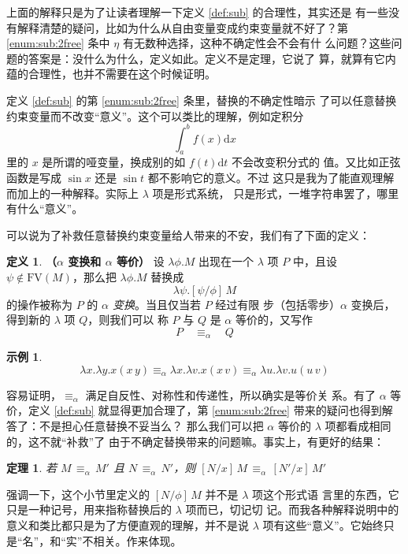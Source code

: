 \documentclass[a4paper,adobefonts]{ctexart}
\newtheorem{theorem}{定理}
\theoremstyle{definition}
\newtheorem{definition}{定义}
\newtheorem{example}{示例}
\begin{document}
上面的解释只是为了让读者理解一下定义 \ref{def:sub} 的合理性，其实还是
有一些没有解释清楚的疑问，比如为什么从自由变量变成约束变量就不好了？第
\ref{enum:sub:2free} 条中 $\eta$ 有无数种选择，这种不确定性会不会有什
么问题？这些问题的答案是：没什么为什么，定义如此。定义不是定理，它说了
算，就算有它内蕴的合理性，也并不需要在这个时候证明。

定义 \ref{def:sub} 的第 \ref{enum:sub:2free} 条里，替换的不确定性暗示
了可以任意替换约束变量而不改变``意义''。这个可以类比的理解，例如定积分
$$
\int_a^bf(x)\text{d}x
$$里的 $x$ 是所谓的哑变量，换成别的如 $f(t)\text{d}t$ 不会改变积分式的
值。又比如正弦函数是写成 $\sin x$ 还是 $\sin t$ 都不影响它的意义。不过
这只是我为了能直观理解而加上的一种解释。实际上 $\lambda$ 项是形式系统，
只是形式，一堆字符串罢了，哪里有什么``意义''。

可以说为了补救任意替换约束变量给人带来的不安，我们有了下面的定义：

\begin{definition}{\bfseries{（$\alpha$ 变换和 $\alpha$ 等价）}}
  设 $\lambda\phi.M$ 出现在一个 $\lambda$ 项 $P$ 中，且设
  $\psi\not\in\text{FV}(M)$，那么把 $\lambda\phi.M$ 替换成
  $$
  \lambda\psi.[\psi/\phi]\,M
  $$的操作被称为 $P$ 的 \emph{$\alpha$ 变换}。当且仅当若 $P$ 经过有限
  步（包括零步）$\alpha$ 变换后，得到新的 $\lambda$ 项 $Q$，则我们可以
  称 $P$ 与 $Q$ 是 $\alpha$ 等价的，又写作
             $$ P\quad\equiv_\alpha\quad Q
             $$
\end{definition}

\begin{example}
  $$
  \lambda x.\lambda y.x(x\,y) \equiv_\alpha\lambda x.\lambda v.x(x\,v) \equiv_\alpha\lambda u.\lambda v.u(u\,v)
  $$
\end{example}

容易证明，$\equiv_\alpha$ 满足自反性、对称性和传递性，所以确实是等价关
系。有了 $\alpha$ 等价，定义 \ref{def:sub} 就显得更加合理了，第
\ref{enum:sub:2free} 带来的疑问也得到解答了：不是担心任意替换不妥当么？
那么我们可以把 $\alpha$ 等价的 $\lambda$ 项都看成相同的，这不就``补救''了
由于不确定替换带来的问题嘛。事实上，有更好的结果：

\begin{theorem}
  若 $M\,\equiv_\alpha\,M'$ 且 $N\,\equiv_\alpha\, N'$，则
  $[N/x]\,M\,\equiv_\alpha\,[N'/x]\,M'$
\end{theorem}

强调一下，这个小节里定义的 $[N/\phi]\,M$ 并不是 $\lambda$ 项这个形式语
言里的东西，它只是一种记号，用来指称替换后的 $\lambda$ 项而已，切记切
记。而我各种解释说明中的意义和类比都只是为了方便直观的理解，并不是说
$\lambda$ 项有这些``意义''。它始终只是``名''，和``实''不相关。作来体现。
\end{document}
